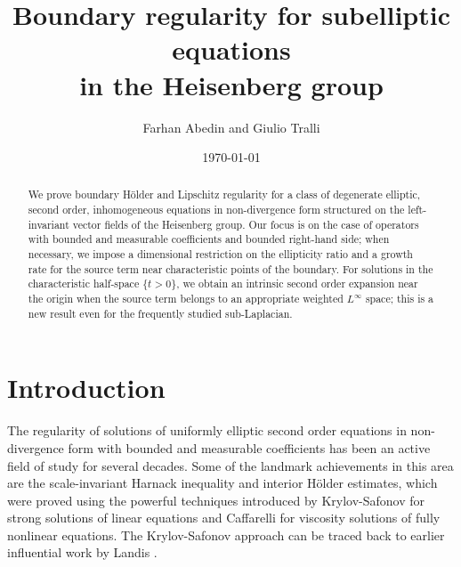 \documentclass[12pt]{amsart}
\begin{document}
\title[Boundary regularity for subelliptic equations in $\mathbb{H}^n$]{
Boundary regularity for subelliptic equations\\ in the Heisenberg group}
\author[F. Abedin and G. Tralli]{Farhan Abedin and Giulio Tralli} 
\address{Department of Mathematics, Lafayette College, Easton, PA 18042}
\address{Dipartimento di Matematica e Informatica, Universit\`a di Ferrara, Via Machiavelli 30, 44121 Ferrara, Italy}

\date{\today}

\begin{abstract}
We prove boundary H\"older and Lipschitz regularity for a class of degenerate elliptic, second order, inhomogeneous equations in non-divergence form structured on the left-invariant vector fields of the Heisenberg group. Our focus is on the case of operators with bounded and measurable coefficients and bounded right-hand side; when necessary, we impose a dimensional restriction on the ellipticity ratio and a growth rate for the source term near characteristic points of the boundary. For solutions in the characteristic half-space $\{t>0\}$, we obtain an intrinsic second order expansion near the origin when the source term belongs to an appropriate weighted $L^{\infty}$ space; this is a new result even for the frequently studied sub-Laplacian.
\end{abstract}

\maketitle


\section{Introduction}


The regularity of solutions of uniformly elliptic second order equations in non-divergence form with bounded and measurable coefficients has been an active field of study for several decades. Some of the landmark achievements in this area are the scale-invariant Harnack inequality and interior H\"older estimates, which were proved using the powerful techniques introduced by Krylov-Safonov \cite{KrylovSafonov80} for strong solutions of linear equations and Caffarelli \cite{Caffarelli89} for viscosity solutions of fully nonlinear equations. The Krylov-Safonov approach can be traced back to earlier influential work by Landis \cite{LandisDokl, LandisBook}.
\end{document}
